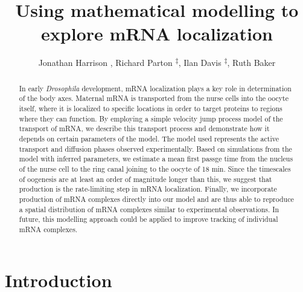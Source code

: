 \documentclass[twocolumn]{biophys}
\begin{document}
\setcounter{page}{1} %

\title{Using mathematical modelling to explore mRNA localization}

\author{Jonathan Harrison \authdagger, Richard Parton \textsuperscript{$\ddagger$}, Ilan Davis \textsuperscript{$\ddagger$}, Ruth Baker \authdagger}

\address{\addrdagger Mathematical Institute, University of Oxford; \textsuperscript{$\ddagger$} Department of Biochemistry, University of Oxford}





\begin{abstract}%
{In early \textit{Drosophila} development, mRNA localization plays a key role in determination of the body axes. 
Maternal mRNA is transported from the nurse cells into the oocyte itself, where it is localized to specific locations in order to target proteins to regions where they can function. 
By employing a simple velocity jump process model of the transport of mRNA, we describe this transport process and demonstrate how it depends on certain parameters of the model.
The model used represents the active transport and diffusion phases observed experimentally.
Based on simulations from the model with inferred parameters, we estimate a mean first passge time from the nucleus of the nurse cell to the ring canal joining to the oocyte of 18 min. 
Since the timescales of oogenesis are at least an order of magnitude longer than this, we suggest that production is the rate-limiting step in mRNA localization. 
Finally, we incorporate production of mRNA complexes directly into our model and are thus able to reproduce a spatial distribution of mRNA complexes similar to experimental observations.
In future, this modelling approach could be applied to improve tracking of individual mRNA complexes. }%
{}
{}
\end{abstract}

\maketitle %

\section{Introduction}
\end{document}
